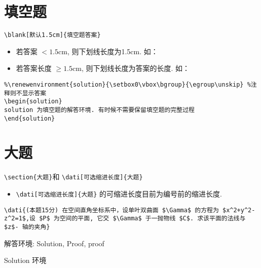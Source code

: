 \documentclass[11pt,twoside]{article} %
\begin{document}
\section{填空题}
\lstinline[style=iltx]|\blank[默认1.5cm]{填空题答案}|  
\begin{itemize}
\item 若答案 $<1.5$cm, 则下划线长度为1.5cm. 如： 
\item 若答案长度 $\geqslant1.5$cm, 则下划线长度为答案的长度. 如： 
\end{itemize}
\begin{lstlisting}
%\renewenvironment{solution}{\setbox0\vbox\bgroup}{\egroup\unskip} %注释则不显示答案
\begin{solution}
solution 为填空题的解答环境. 有时候不需要保留填空题的完整过程
\end{solution}
\end{lstlisting}

\section{大题}
\lstinline[style = iltx]|\section{大题}|和
\lstinline[style=iltx]|\dati[可选缩进长度]{大题}|
\begin{itemize}
\item \lstinline[style=iltx]|\dati[可选缩进长度]{大题}| 的可缩进长度目前为编号前的缩进长度. 
\end{itemize}
\begin{lstlisting}[style=tsdtex]
\dati{(本题15分) 在空间直角坐标系中，设单叶双曲面 $\Gamma$ 的方程为 $x^2+y^2-z^2=1$,设 $P$ 为空间的平面, 它交 $\Gamma$ 于一抛物线 $C$. 求该平面的法线与 $z$- 轴的夹角}
\end{lstlisting}
\vspace{1ex}

\vspace{2.5ex}
\noindent 解答环境: Solution, Proof, proof
\begin{Solution}
Solution 环境
\end{Solution}
\end{document}
